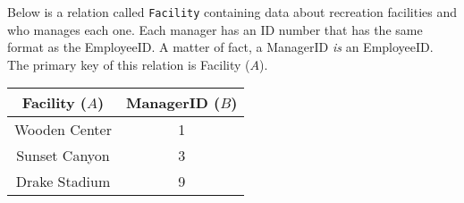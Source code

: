\documentclass{report}
\renewcommand{\it}[1]{\textit{{#1}}}
\renewcommand{\tt}[1]{\texttt{{#1}}}
\begin{document}
\noindent Below is a relation called \tt{Facility} containing data about recreation facilities 
and who manages each one. Each manager has an ID number that has the same format as the 
EmployeeID. A matter of fact, a ManagerID \it{is} an EmployeeID. The primary key of 
this relation is Facility ($A$).

\begin{table}[h!]
    \centering
    \begin{tabular}{|c|c|}
        \hline
        \hline
        Facility ($A$) & ManagerID ($B$) \\
        \hline
        Wooden Center & 1 \\
        \hline
        Sunset Canyon & 3 \\
        \hline
        Drake Stadium & 9 \\
        \hline
        \hline
    \end{tabular}
\end{table}
\end{document}
